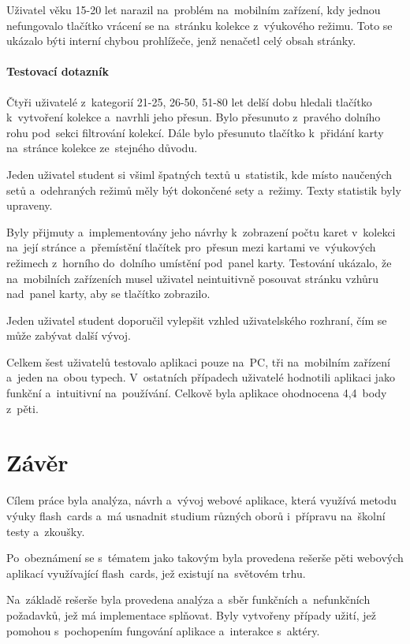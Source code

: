 \documentclass[twoside]{ctuthesis}
\begin{document}
Uživatel věku 15-20 let narazil na~problém na~mobilním zařízení, kdy jednou nefungovalo tlačítko vrácení se na~stránku kolekce z~výukového režimu. Toto se ukázalo býti interní chybou prohlížeče, jenž nenačetl celý obsah stránky.

\subsubsection*{Testovací dotazník}

Čtyři uživatelé z~kategorií 21-25, 26-50, 51-80 let delší dobu hledali tlačítko k~vytvoření kolekce a~navrhli jeho přesun. Bylo přesunuto z~pravého dolního rohu pod~sekci filtrování kolekcí. Dále bylo přesunuto tlačítko k~přidání karty na~stránce kolekce ze~stejného důvodu.

Jeden uživatel student si všiml špatných textů u~statistik, kde místo naučených setů a~odehraných režimů měly být dokončené sety a~režimy. Texty statistik byly upraveny.

Byly přijmuty a~implementovány jeho návrhy k~zobrazení počtu karet v~kolekci na~její stránce a~přemístění tlačítek pro~přesun mezi kartami ve~výukových režimech z~horního do~dolního umístění pod~panel karty. Testování ukázalo, že na~mobilních zařízeních musel uživatel neintuitivně posouvat stránku vzhůru nad~panel karty, aby se tlačítko zobrazilo.

Jeden uživatel student doporučil vylepšit vzhled uživatelského rozhraní, čím se může zabývat další vývoj. 

Celkem šest uživatelů testovalo aplikaci pouze na~PC, tři na~mobilním zařízení a~jeden na~obou typech. V~ostatních případech uživatelé hodnotili aplikaci jako funkční a~intuitivní na~používání. Celkově byla aplikace ohodnocena 4,4~body z~pěti.

\chapter{Závěr}

Cílem práce byla analýza, návrh a~vývoj webové aplikace, která využívá metodu výuky flash~cards a~má usnadnit studium různých oborů i~přípravu na~školní testy a~zkoušky.

Po~obeznámení se s~tématem jako takovým byla provedena rešerše pěti webových aplikací využívající flash~cards, jež existují na~světovém trhu.

Na~základě rešerše byla provedena analýza a~sběr funkčních a~nefunkčních požadavků, jež má implementace splňovat. Byly vytvořeny případy užití, jež pomohou s~pochopením fungování aplikace a~interakce s~aktéry.
\end{document}
